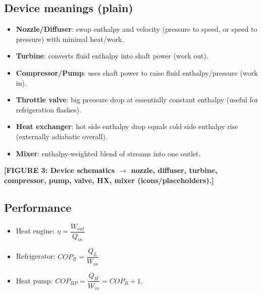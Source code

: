 \documentclass[10pt]{article}
\begin{document}
\begin{multicols}{2}
\subsection*{Device meanings (plain)}
\begin{itemize}
    \item \textbf{Nozzle/Diffuser}: swap enthalpy and velocity (pressure to speed, or speed to pressure) with minimal heat/work.
    \item \textbf{Turbine}: converts fluid enthalpy into shaft power (work out).
    \item \textbf{Compressor/Pump}: uses shaft power to raise fluid enthalpy/pressure (work in).
    \item \textbf{Throttle valve}: big pressure drop at essentially constant enthalpy (useful for refrigeration flashes).
    \item \textbf{Heat exchanger}: hot side enthalpy drop equals cold side enthalpy rise (externally adiabatic overall).
    \item \textbf{Mixer}: enthalpy-weighted blend of streams into one outlet.
\end{itemize}

\textbf{[FIGURE 3: Device schematics $\to$ nozzle, diffuser, turbine, compressor, pump, valve, HX, mixer (icons/placeholders).]}

\subsection{Performance}
\begin{itemize}
    \item Heat engine: $\eta=\dfrac{W_{out}}{Q_{in}}$
    \item Refrigerator: $COP_R=\dfrac{Q_L}{W_{in}}$
    \item Heat pump: $COP_{HP}=\dfrac{Q_H}{W_{in}}=COP_R+1$.
\end{itemize}

\end{multicols}
\end{document}
